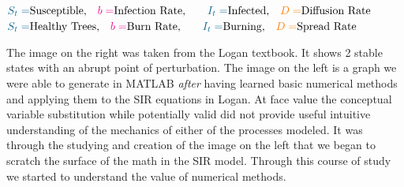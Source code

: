 \documentclass{article}
\begin{document}
\begin{center}
\begin{minipage}[t]{.49\textwidth}
    \end{minipage}\\  
    $\textcolor{MidnightBlue}{S_t=}\text{Susceptible,}\quad\textcolor{magenta}{b=}\text{Infection Rate,}\qquad
    \textcolor{MidnightBlue}{I_t=} \text{Infected,}\quad\textcolor{orange}{D=}\text{Diffusion Rate}$\\
    $\textcolor{MidnightBlue}{S_t=}\text{Healthy Trees,}\quad\textcolor{magenta}{b=}\text{Burn Rate,}\qquad\textcolor{MidnightBlue}{I_t=} \text{Burning,}\quad\textcolor{orange}{D=}\text{Spread Rate}$
\end{center}
The image on the right was taken from the Logan textbook.  It shows 2 stable states with an abrupt point of perturbation. 
The image on the left is a graph we were able to generate in MATLAB \textit{after} having learned basic numerical methods and applying them to the SIR equations in Logan.  At face value the conceptual variable substitution while potentially valid did not provide useful intuitive understanding of the mechanics of either of the processes modeled. It was through the studying and creation of the image on the left that we began to scratch the surface of the math in the SIR model. Through this course of study we started to understand the value of numerical methods.
\end{document}
